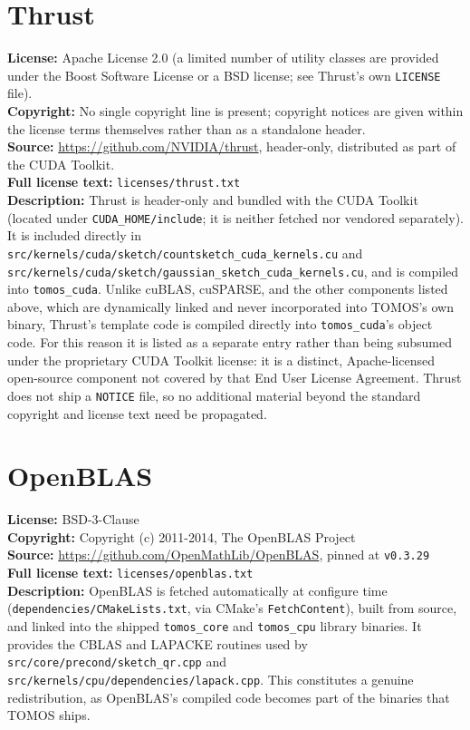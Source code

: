 \documentclass[11pt]{article}
\newcommand{\field}[2]{\noindent\textbf{#1:} #2\\}
\begin{document}
\section{Thrust}

\field{License}{Apache License 2.0 (a limited number of utility classes are provided under the Boost Software License or a BSD license; see Thrust's own \texttt{LICENSE} file).}
\field{Copyright}{No single copyright line is present; copyright notices are given within the license terms themselves rather than as a standalone header.}
\field{Source}{\url{https://github.com/NVIDIA/thrust}, header-only, distributed as part of the CUDA Toolkit.}
\field{Full license text}{\texttt{licenses/thrust.txt}}

\noindent
\textbf{Description:} Thrust is header-only and bundled with the CUDA
Toolkit (located under \texttt{CUDA\_HOME/include}; it is neither fetched
nor vendored separately). It is included directly in
\texttt{src/kernels/cuda/sketch/countsketch\_cuda\_kernels.cu} and
\texttt{src/kernels/cuda/sketch/gaussian\_sketch\_cuda\_kernels.cu}, and is
compiled into \texttt{tomos\_cuda}. Unlike cuBLAS, cuSPARSE, and the other
components listed above, which are dynamically linked and never
incorporated into TOMOS's own binary, Thrust's template code is compiled
directly into \texttt{tomos\_cuda}'s object code. For this reason it is
listed as a separate entry rather than being subsumed under the
proprietary CUDA Toolkit license: it is a distinct, Apache-licensed
open-source component not covered by that End User License Agreement.
Thrust does not ship a \texttt{NOTICE} file, so no additional material
beyond the standard copyright and license text need be propagated.

\section{OpenBLAS}

\field{License}{BSD-3-Clause}
\field{Copyright}{Copyright (c) 2011-2014, The OpenBLAS Project}
\field{Source}{\url{https://github.com/OpenMathLib/OpenBLAS}, pinned at \texttt{v0.3.29}}
\field{Full license text}{\texttt{licenses/openblas.txt}}

\noindent
\textbf{Description:} OpenBLAS is fetched automatically at configure time
(\texttt{dependencies/CMakeLists.txt}, via CMake's \texttt{FetchContent}),
built from source, and linked into the shipped \texttt{tomos\_core} and
\texttt{tomos\_cpu} library binaries. It provides the CBLAS and LAPACKE
routines used by \texttt{src/core/precond/sketch\_qr.cpp} and
\texttt{src/kernels/cpu/dependencies/lapack.cpp}. This constitutes a
genuine redistribution, as OpenBLAS's compiled code becomes part of the
binaries that TOMOS ships.
\end{document}
